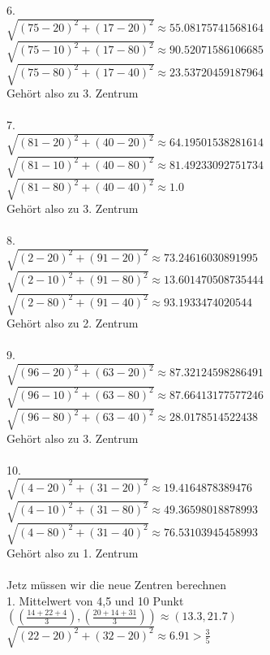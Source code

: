 \begin{enumerate}
6. \\ 
$\sqrt{(75-20)^2 + (17-20)^2} \approx 55.08175741568164$ \\ 
$\sqrt{(75-10)^2 + (17-80)^2} \approx 90.52071586106685$ \\ 
$\sqrt{(75-80)^2 + (17-40)^2} \approx 23.53720459187964$ \\
Gehört also zu 3. Zentrum \\ \\


7. \\ 
$\sqrt{(81-20)^2 + (40-20)^2} \approx 64.19501538281614$ \\ 
$\sqrt{(81-10)^2 + (40-80)^2} \approx 81.49233092751734$ \\ 
$\sqrt{(81-80)^2 + (40-40)^2} \approx 1.0$ \\
Gehört also zu 3. Zentrum \\ \\

8. \\ 
$\sqrt{(2-20)^2 + (91-20)^2} \approx 73.24616030891995$ \\ 
$\sqrt{(2-10)^2 + (91-80)^2} \approx 13.601470508735444$ \\ 
$\sqrt{(2-80)^2 + (91-40)^2} \approx 93.1933474020544$ \\
Gehört also zu 2. Zentrum \\ \\

9. \\ 
$\sqrt{(96-20)^2 + (63-20)^2} \approx 87.32124598286491$ \\ 
$\sqrt{(96-10)^2 + (63-80)^2} \approx 87.66413177577246$ \\ 
$\sqrt{(96-80)^2 + (63-40)^2} \approx 28.0178514522438$ \\
Gehört also zu 3. Zentrum \\ \\

10. \\ 
$\sqrt{(4-20)^2 + (31-20)^2} \approx 19.4164878389476$ \\ 
$\sqrt{(4-10)^2 + (31-80)^2} \approx 49.36598018878993$ \\ 
$\sqrt{(4-80)^2 + (31-40)^2} \approx 76.53103945458993$ \\
Gehört also zu 1. Zentrum \\ \\

Jetz müssen wir die neue Zentren berechnen \\
1. Mittelwert von 4,5 und 10 Punkt
$((\frac{14+22+4}{3}),(\frac{20+14+31}{3})) \approx (13.3, 21.7) $ \\
$\sqrt{(22-20)^2 + (32-20)^2} \approx 6.91  > \frac{3}{5}$ \\


\end{enumerate}
